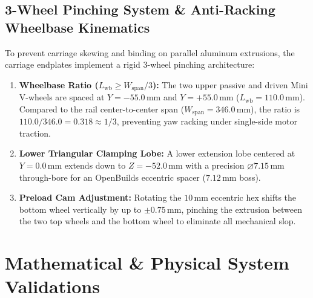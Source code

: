 \documentclass[10pt,a4paper]{article}
\begin{document}
\subsection{3-Wheel Pinching System \& Anti-Racking Wheelbase Kinematics}
To prevent carriage skewing and binding on parallel aluminum extrusions, the carriage endplates implement a rigid 3-wheel pinching architecture:
\begin{enumerate}[leftmargin=*]
    \item \textbf{Wheelbase Ratio ($L_{\text{wb}} \ge W_{\text{span}}/3$):} The two upper passive and driven Mini V-wheels are spaced at $Y = -55.0\,\text{mm}$ and $Y = +55.0\,\text{mm}$ ($L_{\text{wb}} = 110.0\,\text{mm}$). Compared to the rail center-to-center span ($W_{\text{span}} = 346.0\,\text{mm}$), the ratio is $110.0 / 346.0 = 0.318 \approx 1/3$, preventing yaw racking under single-side motor traction.
    \item \textbf{Lower Triangular Clamping Lobe:} A lower extension lobe centered at $Y = 0.0\,\text{mm}$ extends down to $Z = -52.0\,\text{mm}$ with a precision $\varnothing 7.15\,\text{mm}$ through-bore for an OpenBuilds eccentric spacer ($7.12\,\text{mm}$ boss). 
    \item \textbf{Preload Cam Adjustment:} Rotating the $10\,\text{mm}$ eccentric hex shifts the bottom wheel vertically by up to $\pm 0.75\,\text{mm}$, pinching the extrusion between the two top wheels and the bottom wheel to eliminate all mechanical slop.
\end{enumerate}

\clearpage

\section{Mathematical \& Physical System Validations}
\end{document}
